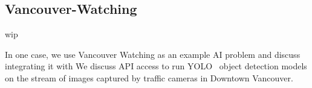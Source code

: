 \subsection{Vancouver-Watching}

wip

In one case, we use Vancouver Watching as an example AI problem and discuss integrating it with  We discuss API access to run YOLO~\cite{YOLO} object detection models on the stream of images captured by traffic cameras in Downtown Vancouver.

